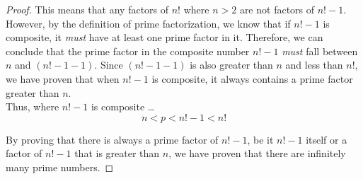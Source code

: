 \documentclass[12pt]{article}
\begin{document}
\begin{proof}
This means that any factors of $n!$ where $n > 2$ are not factors of $n! - 1$. However, by the definition of prime factorization, we know that if $n! - 1$ is composite, it \textit{must} have at least one prime factor in it. Therefore, we can conclude that the prime factor in the composite number $n! - 1$ \textit{must} fall between $n$ and $(n! - 1 - 1)$. Since $(n! - 1 - 1)$ is also greater than $n$ and less than $n!$, we have proven that when $n! - 1$ is composite, it always contains a prime factor greater than $n$.\\

Thus, where $n! - 1$ is composite \ldots \\

\begin{equation}
n < p < n! - 1 < n!
\end{equation}


\bigskip
By proving that there is always a prime factor of $n! - 1$, be it $n! - 1$ itself or a factor of $n! - 1$ that is greater than $n$, we have proven that there are infinitely many prime numbers.
\end{proof}
\end{document}
